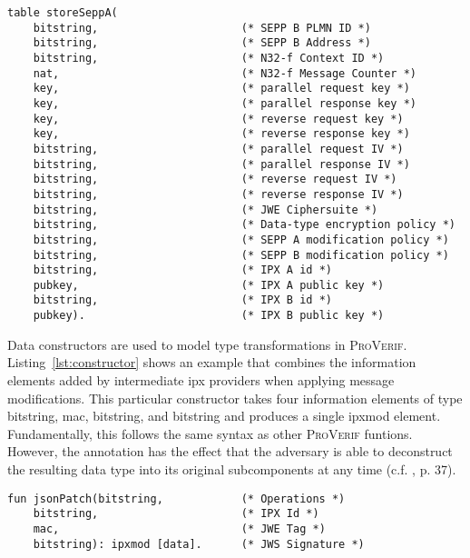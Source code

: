 \begin{lstlisting}[caption={Declaration of local SEPP storage using tables},label={lst:tables},firstnumber=32]
table storeSeppA(
    bitstring,                      (* SEPP B PLMN ID *)
    bitstring,                      (* SEPP B Address *)
    bitstring,                      (* N32-f Context ID *)
    nat,                            (* N32-f Message Counter *)
    key,                            (* parallel request key *)
    key,                            (* parallel response key *)
    key,                            (* reverse request key *)
    key,                            (* reverse response key *)
    bitstring,                      (* parallel request IV *)
    bitstring,                      (* parallel response IV *)
    bitstring,                      (* reverse request IV *)
    bitstring,                      (* reverse response IV *)
    bitstring,                      (* JWE Ciphersuite *)
    bitstring,                      (* Data-type encryption policy *)
    bitstring,                      (* SEPP A modification policy *)
    bitstring,                      (* SEPP B modification policy *)
    bitstring,                      (* IPX A id *)
    pubkey,                         (* IPX A public key *)
    bitstring,                      (* IPX B id *)
    pubkey).                        (* IPX B public key *)
\end{lstlisting}

Data constructors are used to model type transformations in \textsc{ProVerif}.
Listing~\ref{lst:constructor} shows an example that combines the information elements added by intermediate \gls{ipx} providers when applying message modifications.
This particular constructor takes four information elements of type {\sffamily bitstring}, {\sffamily mac}, {\sffamily bitstring}, and {\sffamily bitstring} and produces a single {\sffamily ipxmod} element.
Fundamentally, this follows the same syntax as other \textsc{ProVerif} funtions.
However, the {\sffamily [data]} annotation has the effect that the adversary is able to deconstruct the resulting data type into its original subcomponents at any time (c.f. \cite{blanchet2020proverif}, p. 37).

\begin{lstlisting}[caption={Definition of custom data constructor},label={lst:constructor},firstnumber=75]
fun jsonPatch(bitstring,            (* Operations *)
    bitstring,                      (* IPX Id *)
    mac,                            (* JWE Tag *)
    bitstring): ipxmod [data].      (* JWS Signature *)
\end{lstlisting}

